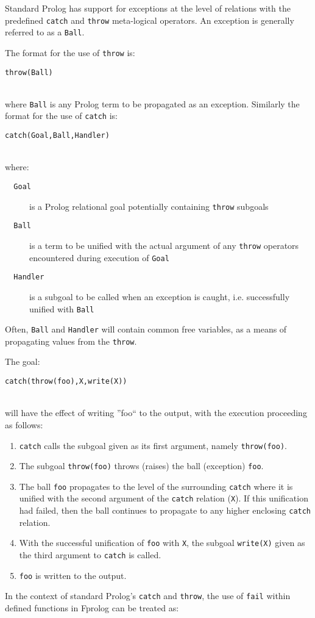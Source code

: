 \documentclass[a4paper,11pt,twoside]{article}
\begin{document}
Standard Prolog \cite{DEDC96} has support for exceptions at the
level of relations with the predefined \texttt{catch} and \texttt{throw}
meta-logical operators.  An exception is generally referred to as a 
\texttt{Ball}.

The format for the use of \texttt{throw} is:\\
\centerline{\texttt{throw(Ball)}}\\
where \texttt{Ball} is any Prolog term to be propagated as an exception.
Similarly the format for the use of \texttt{catch} is:\\
\centerline{\texttt{catch(Goal,Ball,Handler)}}\\
where:
\begin{description}
\item[\texttt{~~Goal}]{ is a Prolog relational goal potentially containing
  \texttt{throw} subgoals}
\item[\texttt{~~Ball}]{ is a term to be unified with the actual argument of any
  \texttt{throw} operators encountered during execution of \texttt{Goal}}
\item[\texttt{~~Handler}]{ is a subgoal to be called when an exception is
  caught, i.e. successfully unified with \texttt{Ball}}
\end{description}
Often, \texttt{Ball} and \texttt{Handler} will contain common free
variables, as a means of propagating values from the \texttt{throw}.

The goal:\\
\centerline{\texttt{catch(throw(foo),X,write(X))}}\\
will have the effect of writing ''foo`` to the output, with the
execution proceeding as follows:
\begin{enumerate}
\item{\texttt{catch} calls the subgoal given as its first argument,
  namely \texttt{throw(foo)}.}
\item{The subgoal \texttt{throw(foo)} throws (raises) the ball (exception)
  \texttt{foo}.}
\item{The ball \texttt{foo} 
  propagates to the level of the surrounding \texttt{catch}
  where it is unified with the second argument of the \texttt{catch}
  relation (\texttt{X}).  If this unification had failed, then the ball
  continues to propagate to any higher enclosing \texttt{catch} relation.}
\item{With the successful unification of \texttt{foo} with \texttt{X},
  the subgoal \texttt{write(X)}
  given as the third argument to \texttt{catch} is called.}
\item{\texttt{foo} is written to the output.}
\end{enumerate}
In the context of standard Prolog's \texttt{catch} and \texttt{throw},
the use of \texttt{fail} within defined functions in Fprolog can be 
treated as:\\
\end{document}
